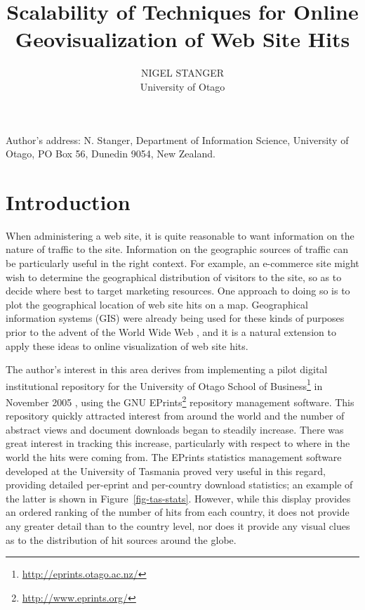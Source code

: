 \documentclass[acmnow]{acmtrans2m}
\title{Scalability of Techniques for Online Geovisualization of Web Site Hits}
\author{NIGEL STANGER \\ University of Otago}
\begin{document}


            
\begin{bottomstuff} 
Author's address: N. Stanger, Department of Information Science,
University of Otago, PO Box 56, Dunedin 9054, New Zealand.
\end{bottomstuff}
            
\maketitle


\section{Introduction}
\label{sec-introduction}

When administering a web site, it is quite reasonable to want
information on the nature of traffic to the site. Information on the
geographic sources of traffic can be particularly useful in the right
context. For example, an e-commerce site might wish to determine the
geographical distribution of visitors to the site, so as to decide
where best to target marketing resources. One approach to doing so
is to plot the geographical location of web site hits on a map.
Geographical information systems (GIS) were already being used for these
kinds of purposes prior to the advent of the World Wide Web
\cite{Beau-JR-1991-GIS}, and it is a natural extension to apply these
ideas to online visualization of web site hits.

The author's interest in this area derives from implementing a pilot
digital institutional repository for the University of Otago School of
Business\footnote{\url{http://eprints.otago.ac.nz/}} in November 2005
\cite{Stan-N-2006-running}, using the GNU
EPrints\footnote{\url{http://www.eprints.org/}} repository management
software. This repository quickly attracted interest from around the
world and the number of abstract views and document downloads began to
steadily increase. There was great interest in tracking this increase,
particularly with respect to where in the world the hits were coming
from. The EPrints statistics management software developed at the
University of Tasmania \cite{Sale-A-2006-stats} proved very useful in
this regard, providing detailed per-eprint and per-country download
statistics; an example of the latter is shown in
Figure~\ref{fig-tas-stats}. However, while this display provides an
ordered ranking of the number of hits from each country, it does not
provide any greater detail than to the country level, nor does it
provide any visual clues as to the distribution of hit sources around
the globe.
\end{document}
